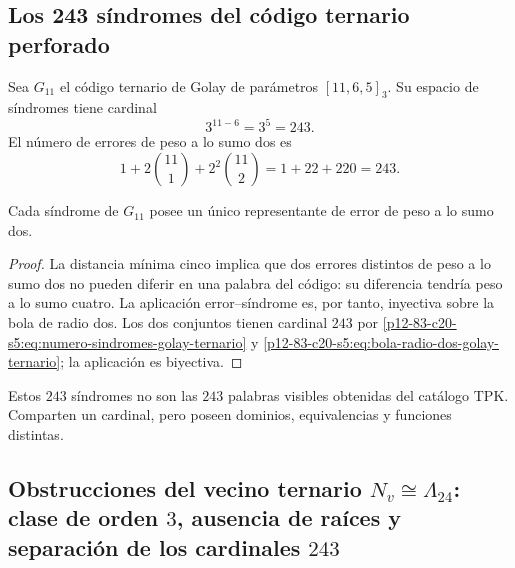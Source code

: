 \subsection{Los 243 síndromes del código ternario perforado}

Sea \(G_{11}\) el código ternario de Golay de parámetros
\([11,6,5]_3\). Su espacio de síndromes tiene cardinal
\begin{equation}
 3^{11-6}=3^5=243.
 \label{p12-83-c20-s5:eq:numero-sindromes-golay-ternario}
\end{equation}
El número de errores de peso a lo sumo dos es
\begin{equation}
 1+2\binom{11}{1}+2^2\binom{11}{2}
 =1+22+220=243.
 \label{p12-83-c20-s5:eq:bola-radio-dos-golay-ternario}
\end{equation}

\begin{proposition}
\label{p12-83-c20-s5:prop:correspondencia-error-sindrome-golay}
Cada síndrome de \(G_{11}\) posee un único representante de error de peso
a lo sumo dos.
\end{proposition}

\begin{proof}
La distancia mínima cinco implica que dos errores distintos de peso a lo
sumo dos no pueden diferir en una palabra del código: su diferencia tendría
peso a lo sumo cuatro. La aplicación error--síndrome es, por tanto,
inyectiva sobre la bola de radio dos. Los dos conjuntos tienen cardinal
\(243\) por \eqref{p12-83-c20-s5:eq:numero-sindromes-golay-ternario} y
\eqref{p12-83-c20-s5:eq:bola-radio-dos-golay-ternario}; la aplicación es biyectiva.
\end{proof}

Estos \(243\) síndromes no son las \(243\) palabras visibles obtenidas del
catálogo TPK. Comparten un cardinal, pero poseen dominios, equivalencias y
funciones distintas.

\subsection{Obstrucciones del vecino ternario \(N_v\cong\Lambda_{24}\): clase de orden \(3\), ausencia de raíces y separación de los cardinales \(243\)}

